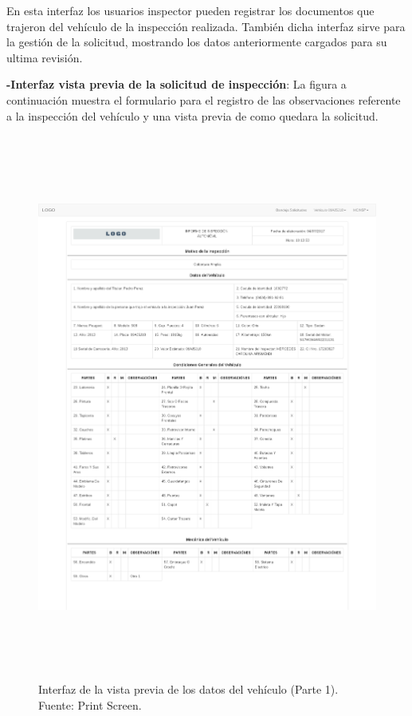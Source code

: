 En esta interfaz los usuarios inspector pueden registrar los documentos que trajeron del vehículo de la inspección realizada. También dicha interfaz sirve para la gestión de la solicitud, mostrando los datos anteriormente cargados para su ultima revisión.

\textbf{-Interfaz vista previa de la solicitud de inspección}: La figura a continuación muestra el formulario para el registro de las observaciones referente a la inspección del vehículo y una vista previa de como quedara la solicitud.

\begin{figure}[H]
\begin{center}
	\includegraphics[width=\textwidth,height=18cm]{img/interfaces/prev_planilla_1.png}
\end{center}
\caption{Interfaz de la vista previa de los datos del vehículo (Parte 1). Fuente: Print Screen.}
\label{fig:interfaz_vista_previa_vehiculo_1}
\end{figure}

